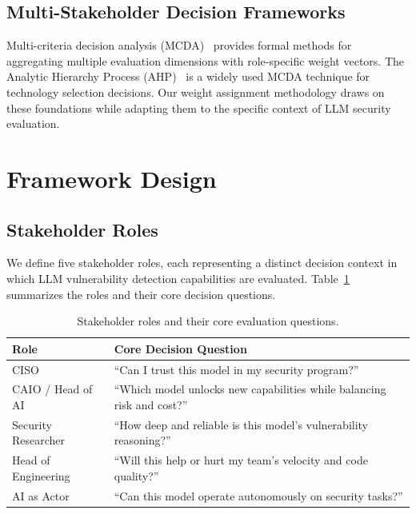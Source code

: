 \documentclass[10pt,twocolumn]{article}
\begin{document}
\subsection{Multi-Stakeholder Decision Frameworks}

Multi-criteria decision analysis (MCDA)~\citep{velasquez2013mcda} provides formal methods for aggregating multiple evaluation dimensions with role-specific weight vectors. The Analytic Hierarchy Process (AHP)~\citep{saaty1990ahp} is a widely used MCDA technique for technology selection decisions. Our weight assignment methodology draws on these foundations while adapting them to the specific context of LLM security evaluation.

\section{Framework Design}
\label{sec:framework}

\subsection{Stakeholder Roles}
\label{sec:roles}

We define five stakeholder roles, each representing a distinct decision context in which LLM vulnerability detection capabilities are evaluated. Table~\ref{tab:roles} summarizes the roles and their core decision questions.

\begin{table}[t]
\centering
\caption{Stakeholder roles and their core evaluation questions.}
\label{tab:roles}
\small
\begin{tabular}{@{}p{2.0cm}p{5.0cm}@{}}
\toprule
\textbf{Role} & \textbf{Core Decision Question} \\
\midrule
CISO & ``Can I trust this model in my security program?'' \\
\addlinespace[3pt]
CAIO / Head of AI & ``Which model unlocks new capabilities while balancing risk and cost?'' \\
\addlinespace[3pt]
Security Researcher & ``How deep and reliable is this model's vulnerability reasoning?'' \\
\addlinespace[3pt]
Head of Engineering & ``Will this help or hurt my team's velocity and code quality?'' \\
\addlinespace[3pt]
AI as Actor & ``Can this model operate autonomously on security tasks?'' \\
\bottomrule
\end{tabular}
\end{table}
\end{document}
